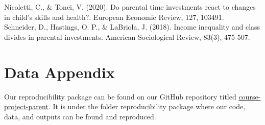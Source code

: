 \documentclass[12pt]{article}
\begin{document}
Nicoletti, C., \& Tonei, V. (2020). Do parental time investments react to changes in child’s skills and health?. European Economic Review, 127, 103491.\\

Schneider, D., Hastings, O. P., \& LaBriola, J. (2018). Income inequality and class divides in parental investments. American Sociological Review, 83(3), 475-507.\\

\newpage
\section*{Data Appendix} \label{sec:appendixa}

Our reproducibility package can be found on our GitHub repository titled \href{https://github.com/ecn310/course-project-parent?tab=readme-ov-file#master-documentation-file}{course-project-parent}. It is under the folder reproducibility package where our code, data, and outputs can be found and reproduced.
\end{document}
